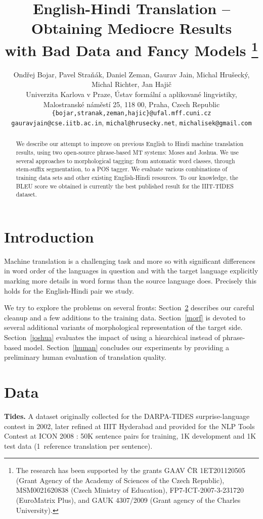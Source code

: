 \documentclass[11pt]{article}
\title{English-Hindi Translation -- Obtaining Mediocre Results\\with Bad Data and
Fancy Models%
\thanks{ \hspace{.6em}The research has been supported by the grants GAAV ČR 1ET201120505 (Grant Agency of the Academy of Sciences of the Czech Republic), 
MSM0021620838 (Czech Ministry of Education),
FP7-ICT-2007-3-231720 (EuroMatrix Plus), and GAUK 4307/2009 (Grant agency of the Charles University).
}
}
\author{Ondřej Bojar, Pavel Straňák, Daniel Zeman, Gaurav Jain, Michal Hrušecký, Michal Richter, Jan Hajič\\
Univerzita Karlova v Praze, Ústav formální a aplikované lingvistiky,\\
Malostranské náměstí 25, 118 00, Praha, Czech Republic\\ 
\texttt{\{bojar,stranak,zeman,hajic\}@ufal.mff.cuni.cz}\\
\texttt{gauravjain@cse.iitb.ac.in}, \texttt{michal@hrusecky.net}, \texttt{michalisek@gmail.com}
}
\date{}
\def\parcite#1{\citep{#1}}
\def\Sref#1{Section~\ref{#1}}
\begin{document}
\maketitle
\thispagestyle{fancy}

\begin{abstract}
We describe our attempt to improve on previous English to Hindi machine
translation results, using two open-source phrase-based MT systems: Moses and
Joshua. We use several approaches to morphological tagging: from automatic word
classes, through stem-suffix segmentation, to a POS tagger.
We evaluate various combinations of training data
sets and other existing English-Hindi resources. To our knowledge, the BLEU
score we obtained is currently the best published result for the IIIT-TIDES
dataset.
\end{abstract}

\section{Introduction}
\label{sec:intro}

Machine translation is a challenging task and more so with significant
differences in word order of the languages in question and with the target
language explicitly marking more details in word forms than the source language
does. Precisely this holds for the English-Hindi pair we study.

We try to
explore the problems on several fronts: \Sref{sec:data} describes our
careful cleanup and a few additions to the training data. \Sref{morf} is devoted
to several additional variants of morphological representation of the target
side.
\Sref{joshua} evaluates the impact of using a hiearchical
instead of phrase-based model. \Sref{human} concludes our experiments by
providing a preliminary human evaluation of translation quality.

\section{Data}
\label{sec:data}

\def\microsection#1{{\bf #1.}}

\microsection{Tides}
\label{sec:tides}
A dataset originally collected for the DARPA-TIDES surprise-language contest in
2002, later refined at IIIT Hyderabad and provided for the NLP Tools Contest at
ICON 2008 \citep{nlptoolscontest:2008:summary}: 50K sentence pairs for training,
1K development and 1K test data (1~reference translation per sentence).
\end{document}
